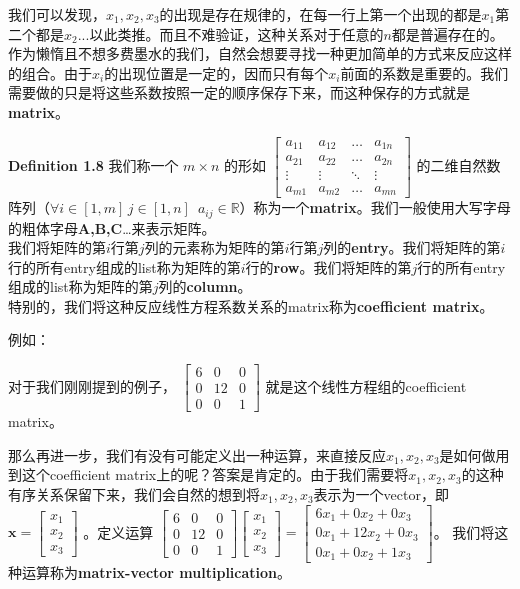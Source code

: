 \documentclass{report}
\def\R{\mathbb{R}}
\def\b{\,\,\,}
\def\defb{\begin{tcolorbox} [colback=yellow!20, colframe=orange!80, sharp corners, leftrule={5pt}, rightrule={0pt}, toprule={0pt}, bottomrule={0pt}, left={2pt}, right={2pt}, top={3pt}, bottom={3pt}]}
\def\defe{\end{tcolorbox}}
\def\egb{\begin{tcolorbox} [colback=blue!20, colframe=blue!80, sharp corners, leftrule={5pt}, rightrule={0pt}, toprule={0pt}, bottomrule={0pt}, left={2pt}, right={2pt}, top={3pt}, bottom={3pt}]}
\def\ege{\end{tcolorbox}}
\begin{document}
我们可以发现，$x_1,x_2,x_3$的出现是存在规律的，在每一行上第一个出现的都是$x_1$第二个都是$x_2$...以此类推。而且不难验证，这种关系对于任意的$n$都是普遍存在的。作为懒惰且不想多费墨水的我们，自然会想要寻找一种更加简单的方式来反应这样的组合。由于$x_i$的出现位置是一定的，因而只有每个$x_i$前面的系数是重要的。我们需要做的只是将这些系数按照一定的顺序保存下来，而这种保存的方式就是\textbf{matrix}。

\defb 
	\textbf{Definition 1.8}
	我们称一个 $ m \times n $ 的形如
	$\left[ \begin{matrix}
		a_{11} & a_{12} & \dots & a_{1n} \\
		a_{21} & a_{22} & \dots & a_{2n} \\
		\vdots & \vdots & \ddots & \vdots \\
		a_{m1} & a_{m2} & \dots & a_{mn}		
	\end{matrix}\right]$
	的二维自然数阵列（$\forall i \in [1,m] \, j \in [1,n] \b a_{ij} \in \R $）称为一个\textbf{matrix}。我们一般使用大写字母的粗体字母\textbf{A,B,C}\dots 来表示矩阵。\\
	
	我们将矩阵的第$i$行第$j$列的元素称为矩阵的第$i$行第$j$列的\textbf{entry}。我们将矩阵的第$i$行的所有entry组成的list称为矩阵的第$i$行的\textbf{row}。我们将矩阵的第$j$行的所有entry组成的list称为矩阵的第$j$列的\textbf{column}。\\

	特别的，我们将这种反应线性方程系数关系的matrix称为\textbf{coefficient matrix}。
\defe

\egb
例如：

对于我们刚刚提到的例子，
$\left[ \begin{matrix}
	6 & 0 & 0 \\
	0 & 12 & 0 \\
	0 & 0 & 1
\end{matrix}\right]$
就是这个线性方程组的coefficient matrix。
\ege

那么再进一步，我们有没有可能定义出一种运算，来直接反应$x_1,x_2,x_3$是如何做用到这个coefficient matrix上的呢？答案是肯定的。由于我们需要将$x_1,x_2,x_3$的这种有序关系保留下来，我们会自然的想到将$x_1,x_2,x_3$表示为一个vector，即
$\mathbf{x} = 
\left[ \begin{matrix}
	x_1 \\
	x_2 \\
	x_3
\end{matrix}\right]
$
。定义运算 
$
\left[ \begin{matrix}
	6 & 0 & 0 \\
	0 & 12 & 0 \\
	0 & 0 & 1
\end{matrix}\right]
\left[ \begin{matrix}
	x_1 \\
	x_2 \\
	x_3
\end{matrix}\right]
=
\left[ \begin{matrix}
	6x_1 + 0x_2 + 0x_3\\
	0x_1 + 12x_2 + 0x_3\\
	0x_1 + 0x_2 + 1x_3
\end{matrix}\right]
$。
我们将这种运算称为\textbf{matrix-vector multiplication}。
\end{document}
